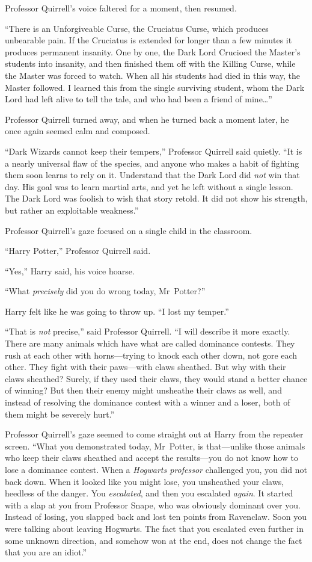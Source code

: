 Professor Quirrell’s voice faltered for a moment, then resumed.

“There is an Unforgiveable Curse, the Cruciatus Curse, which produces unbearable pain. If the Cruciatus is extended for longer than a few minutes it produces permanent insanity. One by one, the Dark Lord Crucioed the Master’s students into insanity, and then finished them off with the Killing Curse, while the Master was forced to watch. When all his students had died in this way, the Master followed. I learned this from the single surviving student, whom the Dark Lord had left alive to tell the tale, and who had been a friend of mine…”

Professor Quirrell turned away, and when he turned back a moment later, he once again seemed calm and composed.

“Dark Wizards cannot keep their tempers,” Professor Quirrell said quietly. “It is a nearly universal flaw of the species, and anyone who makes a habit of fighting them soon learns to rely on it. Understand that the Dark Lord did \emph{not} win that day. His goal was to learn martial arts, and yet he left without a single lesson. The Dark Lord was foolish to wish that story retold. It did not show his strength, but rather an exploitable weakness.”

Professor Quirrell’s gaze focused on a single child in the classroom.

“Harry Potter,” Professor Quirrell said.

“Yes,” Harry said, his voice hoarse.

“What \emph{precisely} did you do wrong today, Mr~Potter?”

Harry felt like he was going to throw up. “I lost my temper.”

“That is \emph{not} precise,” said Professor Quirrell. “I will describe it more exactly. There are many animals which have what are called dominance contests. They rush at each other with horns—trying to knock each other down, not gore each other. They fight with their paws—with claws sheathed. But why with their claws sheathed? Surely, if they used their claws, they would stand a better chance of winning? But then their enemy might unsheathe their claws as well, and instead of resolving the dominance contest with a winner and a loser, both of them might be severely hurt.”

Professor Quirrell’s gaze seemed to come straight out at Harry from the repeater screen. “What you demonstrated today, Mr~Potter, is that—unlike those animals who keep their claws sheathed and accept the results—you do not know how to lose a dominance contest. When a \emph{Hogwarts professor} challenged you, you did not back down. When it looked like you might lose, you unsheathed your claws, heedless of the danger. You \emph{escalated}, and then you escalated \emph{again}. It started with a slap at you from Professor Snape, who was obviously dominant over you. Instead of losing, you slapped back and lost ten points from Ravenclaw. Soon you were talking about leaving Hogwarts. The fact that you escalated even further in some unknown direction, and somehow won at the end, does not change the fact that you are an idiot.”

